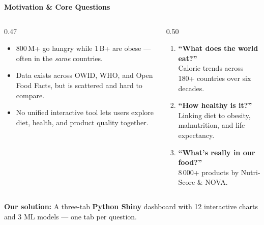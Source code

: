 \documentclass[aspectratio=169, 10pt]{beamer}
\begin{document}
\begin{frame}
\begin{center}
  {\large\bfseries\textcolor{NDarkGreen}{Motivation \& Core Questions}}
\end{center}
\vspace{-4pt}
\begin{columns}[T]
  \begin{column}{0.47\textwidth}
    \begin{tcolorbox}[obox, title={\footnotesize\bfseries Why It Matters},
      coltitle=white, colbacktitle=NOrange]
      \footnotesize
      \begin{itemize}\setlength\itemsep{1pt}
        \item 800\,M+ go hungry while 1\,B+ are obese --- often in the
              \emph{same} countries.
        \item Data exists across OWID, WHO, and Open Food Facts, but is
              scattered and hard to compare.
        \item No unified interactive tool lets users explore diet,
              health, and product quality together.
      \end{itemize}
    \end{tcolorbox}
  \end{column}
  \begin{column}{0.50\textwidth}
    \begin{tcolorbox}[ybox, title={\footnotesize\bfseries Three Core Questions},
      coltitle=NBrown, colbacktitle=NYellow!35]
      \footnotesize
      \begin{enumerate}\setlength\itemsep{2pt}
        \item \textbf{``What does the world eat?''}\\ Calorie trends across 180+ countries over six decades.
        \item \textbf{``How healthy is it?''}\\ Linking diet to obesity, malnutrition, and life expectancy.
        \item \textbf{``What's really in our food?''}\\ 8\,000+ products by Nutri-Score \& NOVA.
      \end{enumerate}
    \end{tcolorbox}
  \end{column}
\end{columns}
\vspace{3pt}
\begin{tcolorbox}[dbox, halign=center]
  \footnotesize
  \textbf{Our solution:} A three-tab \textbf{Python Shiny} dashboard with 12 interactive charts
  and 3 ML models --- one tab per question.
\end{tcolorbox}
\end{frame}
\end{document}
